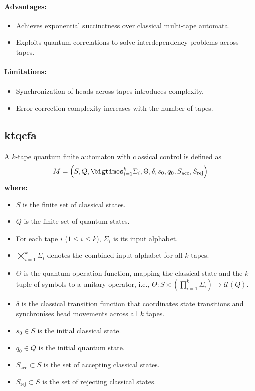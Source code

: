 \paragraph{Advantages:}
\begin{itemize}
    \item Achieves exponential succinctness over classical multi-tape automata.
    \item Exploits quantum correlations to solve interdependency problems across tapes.
\end{itemize}

\paragraph{Limitations:}
\begin{itemize}
    \item Synchronization of heads across tapes introduces complexity.
    \item Error correction complexity increases with the number of tapes.
\end{itemize}

\subsection{\acrfull{ktqcfa}}
\label{subsec:ktqcfa}
\begin{definition}
A \( k \)-tape quantum finite automaton with classical control is defined as 
\[
M = \Bigl(S, Q, \bigtimes_{i=1}^{k} \Sigma_i, \Theta, \delta, s_0, q_0, S_{\text{acc}}, S_{\text{rej}}\Bigr)
\]
\textbf{where:}
\begin{itemize}
    \item \( S \) is the finite set of classical states.
    \item \( Q \) is the finite set of quantum states.
    \item For each tape \( i \) (\( 1 \leq i \leq k \)), \( \Sigma_i \) is its input alphabet.
    \item \( \bigtimes_{i=1}^{k} \Sigma_i \) denotes the combined input alphabet for all \( k \) tapes.
    \item \( \Theta \) is the quantum operation function, mapping the classical state and the \( k \)-tuple of symbols to a unitary operator, i.e., \(\Theta: S \times \left(\prod_{i=1}^{k} \Sigma_i\right) \to \mathcal{U}(Q)\).
    \item \( \delta \) is the classical transition function that coordinates state transitions and synchronises head movements across all \( k \) tapes.
    \item \( s_0 \in S \) is the initial classical state.
    \item \( q_0 \in Q \) is the initial quantum state.
    \item \( S_{\text{acc}} \subset S \) is the set of accepting classical states.
    \item \( S_{\text{rej}} \subset S \) is the set of rejecting classical states.
\end{itemize}
\end{definition}

